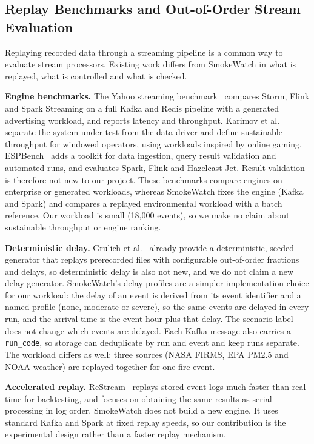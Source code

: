 \subsection{Replay Benchmarks and Out-of-Order Stream Evaluation}

Replaying recorded data through a streaming pipeline is a common way to evaluate stream processors. Existing work differs from SmokeWatch in what is replayed, what is controlled and what is checked.

\textbf{Engine benchmarks.} The Yahoo streaming benchmark~\cite{chintapalli2016benchmarking} compares Storm, Flink and Spark Streaming on a full Kafka and Redis pipeline with a generated advertising workload, and reports latency and throughput. Karimov et al.~\cite{karimov2018benchmarking} separate the system under test from the data driver and define sustainable throughput for windowed operators, using workloads inspired by online gaming. ESPBench~\cite{hesse2021} adds a toolkit for data ingestion, query result validation and automated runs, and evaluates Spark, Flink and Hazelcast Jet. Result validation is therefore not new to our project. These benchmarks compare engines on enterprise or generated workloads, whereas SmokeWatch fixes the engine (Kafka and Spark) and compares a replayed environmental workload with a batch reference. Our workload is small (18{,}000 events), so we make no claim about sustainable throughput or engine ranking.

\textbf{Deterministic delay.} Grulich et al.~\cite{grulich2019generating} already provide a deterministic, seeded generator that replays prerecorded files with configurable out-of-order fractions and delays, so deterministic delay is also not new, and we do not claim a new delay generator. SmokeWatch's delay profiles are a simpler implementation choice for our workload: the delay of an event is derived from its event identifier and a named profile (none, moderate or severe), so the same events are delayed in every run, and the arrival time is the event hour plus that delay. The scenario label does not change which events are delayed. Each Kafka message also carries a \texttt{run\_code}, so storage can deduplicate by run and event and keep runs separate. The workload differs as well: three sources (NASA FIRMS, EPA PM2.5 and NOAA weather) are replayed together for one fire event.

\textbf{Accelerated replay.} ReStream~\cite{schleiersmith2016} replays stored event logs much faster than real time for backtesting, and focuses on obtaining the same results as serial processing in log order. SmokeWatch does not build a new engine. It uses standard Kafka and Spark at fixed replay speeds, so our contribution is the experimental design rather than a faster replay mechanism.

